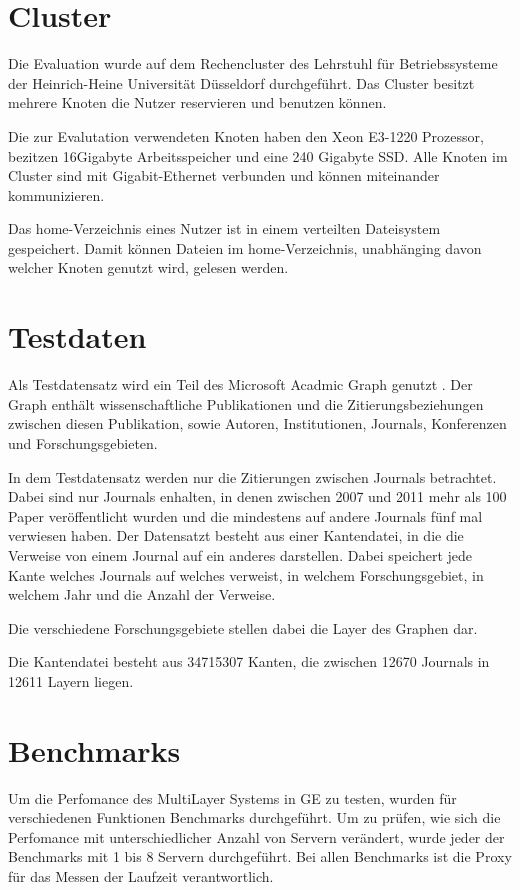 
\section{Cluster}

Die Evaluation wurde auf dem Rechencluster des Lehrstuhl für Betriebssysteme der Heinrich-Heine Universität Düsseldorf durchgeführt.
Das Cluster besitzt mehrere Knoten die Nutzer reservieren und benutzen können.

Die zur Evalutation verwendeten Knoten haben den Xeon E3-1220 Prozessor, bezitzen 16Gigabyte Arbeitsspeicher und eine 240 Gigabyte SSD.
Alle Knoten im Cluster sind mit Gigabit-Ethernet verbunden und können miteinander kommunizieren. 

Das home-Verzeichnis eines Nutzer ist in einem verteilten Dateisystem gespeichert. Damit können Dateien im home-Verzeichnis, unabhänging davon welcher Knoten genutzt wird, gelesen werden.

\section{Testdaten}


Als Testdatensatz wird ein Teil des Microsoft Acadmic Graph genutzt \cite{sinha2015an}. Der Graph enthält wissenschaftliche Publikationen und die Zitierungsbeziehungen zwischen diesen Publikation, sowie Autoren, Institutionen, Journals, Konferenzen und Forschungsgebieten.

In dem Testdatensatz werden nur die Zitierungen zwischen Journals betrachtet. Dabei sind nur Journals enhalten, in denen zwischen 2007 und 2011 mehr als 100 Paper veröffentlicht wurden und die mindestens auf andere Journals fünf mal verwiesen haben.
Der Datensatzt besteht aus einer Kantendatei, in die die Verweise von einem Journal auf ein anderes darstellen. Dabei speichert jede Kante welches Journals auf welches verweist, in welchem Forschungsgebiet, in welchem Jahr und die Anzahl der Verweise.

Die verschiedene Forschungsgebiete stellen dabei die Layer des Graphen dar.

Die Kantendatei besteht aus 34715307 Kanten, die zwischen 12670 Journals in 12611 Layern liegen.


\section{Benchmarks}

Um die Perfomance des MultiLayer Systems in GE zu testen, wurden für verschiedenen Funktionen Benchmarks durchgeführt. Um zu prüfen, wie sich die Perfomance mit unterschiedlicher Anzahl von Servern verändert,
wurde jeder der Benchmarks mit 1 bis 8 Servern durchgeführt. Bei allen Benchmarks ist die Proxy für das Messen der Laufzeit verantwortlich.

